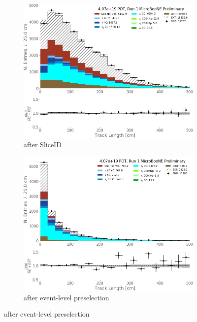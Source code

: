 \begin{figure}[H] 
\begin{center}
    \begin{subfigure}[b]{0.3\textwidth}
    \centering
    \includegraphics[width=1.00\textwidth]{NuMuCCsel/Images/Ryan/Run1_trklen_sliceID.jpg}
    \caption{\label{fig:NuMUCCsel:ryan:trklenSliceID} after SliceID}
    \end{subfigure}
    \begin{subfigure}[b]{0.3\textwidth}
    \centering
    \includegraphics[width=1.00\textwidth]{NuMuCCsel/Images/Ryan/Run1_trklen_evtsel.jpg}
    \caption{\label{fig:NuMUCCsel:ryan:trklenEvt} after event-level preselection}

\end{subfigure}
\end{center}
\end{figure}
